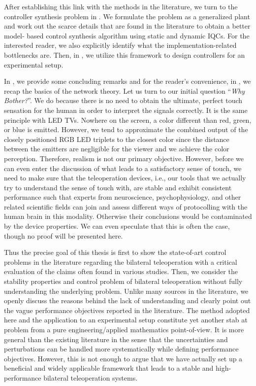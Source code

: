 After establishing this link with the methods in the literature, we turn to the controller synthesis problem in . We 
formulate the problem as a generalized plant and work out the scarce details that are found in the literature to obtain a better model-
based control synthesis algorithm using static and dynamic IQCs. For the interested reader, we also explicitly identify what the 
implementation-related bottlenecks are. Then, in , we utilize this framework to design controllers for an experimental 
setup.

In , we provide some concluding remarks and for the reader's convenience, in , we recap the basics 
of the network theory.
\newpage
Let us turn to our initial question \enquote{\emph{Why Bother?}}. We do because there is no need to obtain the ultimate, perfect touch sensation for 
the human in order to interpret the signals correctly. It is the same principle with LED TVs. Nowhere on the screen, a color different 
than red, green, or blue is emitted. However, we tend to approximate the combined output of the closely positioned RGB LED triplets to 
the closest color since the distance between the emitters are negligible for the viewer and we achieve the color perception. Therefore, 
realism is not our primary objective. However, before we can even enter the discussion of what leads to a satisfactory sense of touch, 
we need to make sure that the teleoperation devices, i.e., our tools that we actually try to understand the sense of touch with, are 
stable and exhibit consistent performance such that experts from neuroscience, psychophysiology, and other related scientific fields can 
join and assess different ways of protocolling with the human brain in this modality. Otherwise their conclusions would be contaminated 
by the device properties. We can even speculate that this is often the case, though no proof will be presented here.  


Thus the precise goal of this thesis is first to show the state-of-art control problems in the literature regarding the bilateral 
teleoperation with a critical evaluation of the claims often found in various studies. Then, we consider the stability properties and 
control problem of bilateral teleoperation without fully understanding the underlying problem. Unlike many sources in the literature, we 
openly discuss the reasons behind the lack of understanding and clearly point out the vague performance objectives reported in the 
literature. The method adopted here and the application to an experimental setup constitute yet another stab at problem from a pure 
engineering/applied mathematics point-of-view. It is more general than the existing literature in the sense that the uncertainties and 
perturbations can be handled more systematically while defining performance objectives. However, this is not enough to argue that we have 
actually set up a beneficial and widely applicable framework that leads to a stable and high-performance bilateral teleoperation systems. 
